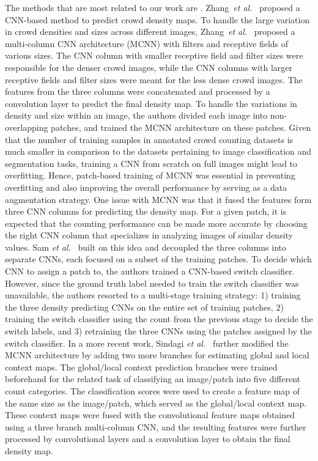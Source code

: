\documentclass[runningheads]{llncs}
\begin{document}
The methods that are most related to our work are \cite{zhang2016single,sam2017switching,sindagi2017generating}. Zhang~\textit{et al.}~\cite{zhang2016single} proposed a CNN-based method to predict crowd density maps. To handle the large variation in crowd densities and sizes across different images,  Zhang~\textit{et al.}~\cite{zhang2016single} proposed a multi-column CNN architecture (MCNN) with filters and receptive fields of various sizes. The CNN column with smaller receptive field and filter sizes were responsible for the denser crowd images, while the CNN columns with larger receptive fields and filter sizes were meant for the less dense crowd images. The features from the three columns were concatenated and processed by a \mbox{} convolution layer to predict the final density map. To handle the variations in density and size within an image, the authors divided each image into non-overlapping patches, and trained the MCNN architecture on these patches. 
Given that the number of training samples in annotated crowd counting datasets is much smaller in comparison to the datasets pertaining to image classification and segmentation tasks, training a CNN from scratch on full images might lead to overfitting. Hence, patch-based training of MCNN was essential in preventing overfitting and also improving the overall  performance by serving as a data augmentation strategy. One issue with MCNN was that it fused the features form three CNN columns for predicting the density map. For a given patch, it is expected that the counting performance can be made more accurate by choosing the right CNN column that specializes in analyzing images of similar density values. 
Sam \textit{et al.}~\cite{sam2017switching} built on this idea and decoupled the three columns into separate CNNs, each focused on a subset of the training patches. To decide which CNN to assign a patch to, the authors trained a CNN-based switch classifier. However, since the ground truth label needed to train the switch classifier was unavailable, the authors resorted to a multi-stage training strategy: 1) training the three density predicting CNNs on the entire set of training patches, 2) training the switch classifier using the count from the previous stage to decide the switch labels, and 3) retraining the three CNNs using the patches assigned by the switch classifier.
In a more recent work, Sindagi \textit{et al.}~\cite{sindagi2017generating} further modified the MCNN architecture by adding two more branches for estimating global and local context maps. The global/local context prediction branches were trained beforehand for the related task of classifying an image/patch into five different count categories. The classification scores were used to create a feature map of the same size as the image/patch, which served as the global/local context map. These context maps were fused with the convolutional feature maps obtained using a three branch multi-column CNN, and the resulting features were further processed by convolutional layers and a  convolution layer to obtain the final density map.
\end{document}
